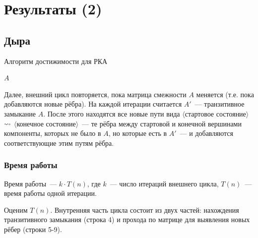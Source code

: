 \section{Результаты (2)}\label{section:dyck_1}

\subsection{Дыра}

\begin{algorithm}[H]
    \begin{algorithmic}[1]
    \caption{Алгоритм достижимости для РКА}
    \label{algo:P}
                        \EndIf
                    \EndFor
               \EndFor
            \EndFor
        \EndWhile
    \State \Return $A$
    \EndFunction
    \end{algorithmic}
\end{algorithm}

Далее, внешний цикл повторяется, пока матрица смежности $A$ меняется (т.е. пока добавляются новые рёбра). На каждой итерации считается $A'$~--- транзитивное замыкание $A$. После этого находятся все новые пути вида $\langle$стартовое состояние$\rangle$ $\rightsquigarrow$ $\langle$конечное состояние$\rangle$~--- те рёбра между стартовой и конечной вершинами компоненты, которых не было в $A$, но которые есть в $A'$~--- и добавляются соответствующие этим путям рёбра.

\subsubsection*{Время работы}

Время работы~--- $k \cdot T(n)$, где $k$~--- число итераций внешнего цикла, $T(n)$~--- время работы одной итерации. 

Оценим $T(n)$. Внутренняя часть цикла состоит из двух частей: нахождения транзитивного замыкания (строка 4) и прохода по матрице для выявления новых рёбер (строки 5-9). 

